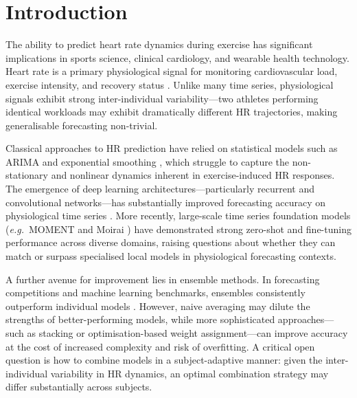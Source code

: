 \documentclass[11pt,a4paper]{article}
\newcommand{\eg}{\textit{e.g.}}
\begin{document}
\newpage
\tableofcontents
\newpage

\section{Introduction}
\label{sec:intro}

The ability to predict heart rate dynamics during exercise has significant
implications in sports science, clinical cardiology, and wearable health
technology.  Heart rate is a primary physiological signal for monitoring
cardiovascular load, exercise intensity, and recovery status \cite{achten2003}.
Unlike many time series, physiological signals exhibit strong inter-individual
variability—two athletes performing identical workloads may exhibit
dramatically different HR trajectories, making generalisable forecasting
non-trivial.

Classical approaches to HR prediction have relied on statistical models such as
ARIMA and exponential smoothing \cite{box2015}, which struggle to capture the
non-stationary and nonlinear dynamics inherent in exercise-induced HR
responses.  The emergence of deep learning architectures—particularly recurrent
and convolutional networks—has substantially improved forecasting accuracy on
physiological time series \cite{nakamura2020}.  More recently, large-scale time
series foundation models (\eg\ MOMENT \cite{goswami2024moment} and Moirai
\cite{woo2024moirai}) have demonstrated strong zero-shot and fine-tuning
performance across diverse domains, raising questions about whether they can
match or surpass specialised local models in physiological forecasting contexts.

A further avenue for improvement lies in ensemble methods.  In forecasting
competitions and machine learning benchmarks, ensembles consistently outperform
individual models \cite{makridakis2018m4}.  However, naive averaging may dilute
the strengths of better-performing models, while more sophisticated
approaches—such as stacking \cite{wolpert1992} or optimisation-based weight
assignment—can improve accuracy at the cost of increased complexity and risk of
overfitting.  A critical open question is how to combine models in a
subject-adaptive manner: given the inter-individual variability in HR dynamics,
an optimal combination strategy may differ substantially across subjects.
\end{document}
